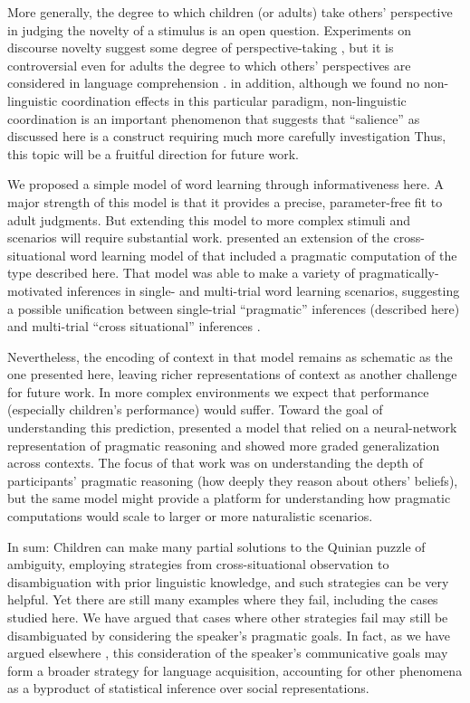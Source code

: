 \documentclass[man,noapacite]{apa2}
\begin{document}
More generally, the degree to which children (or adults) take others' perspective in judging the novelty of a stimulus is an open question. Experiments on discourse novelty suggest some degree of perspective-taking \cite{akhtar1996}, but it is controversial even for adults the degree to which others' perspectives are considered in language comprehension \cite{keysar2003,nadig2002,brown-schmidt2008}. in addition, although we found no non-linguistic coordination effects in this particular paradigm, non-linguistic coordination is an important phenomenon that suggests that ``salience'' as discussed here is a construct requiring much more carefully investigation \cite{schelling1980,clark1983}  Thus, this topic will be a fruitful direction for future work. 

We proposed a simple model of word learning through informativeness here. A major strength of this model is that it provides a precise, parameter-free fit to adult judgments. But extending this model to more complex stimuli and scenarios will require substantial work.  presented an extension of the cross-situational word learning model of  that included a pragmatic computation of the type described here. That model was able to make a variety of pragmatically-motivated inferences in single- and multi-trial word learning scenarios, suggesting a possible unification between single-trial ``pragmatic'' inferences (described here) and multi-trial ``cross situational'' inferences \cite{yu2007b,frank2009}. 

Nevertheless, the encoding of context in that model remains as schematic as the one presented here, leaving richer representations of context as another challenge for future work. In more complex environments we expect that performance (especially children's performance) would suffer. Toward the goal of understanding this prediction,  presented a model that relied on a neural-network representation of pragmatic reasoning and showed more graded generalization across contexts. The focus of that work was on understanding the depth of participants' pragmatic reasoning (how deeply they reason about others' beliefs), but the same model might provide a platform for understanding how pragmatic computations would scale to larger or more naturalistic scenarios. 

In sum: Children can make many partial solutions to the Quinian \citeyear{quine1960} puzzle of ambiguity, employing strategies from cross-situational observation to disambiguation with prior linguistic knowledge, and such strategies can be very helpful. Yet there are still many examples where they fail, including the cases studied here. We have argued that cases where other strategies fail may still be disambiguated by considering the speaker's pragmatic goals. In fact, as we have argued elsewhere \cite{frank2009}, this consideration of the speaker's communicative goals may form a broader strategy for language acquisition, accounting for other phenomena as a byproduct of statistical inference over social representations. 
\end{document}
